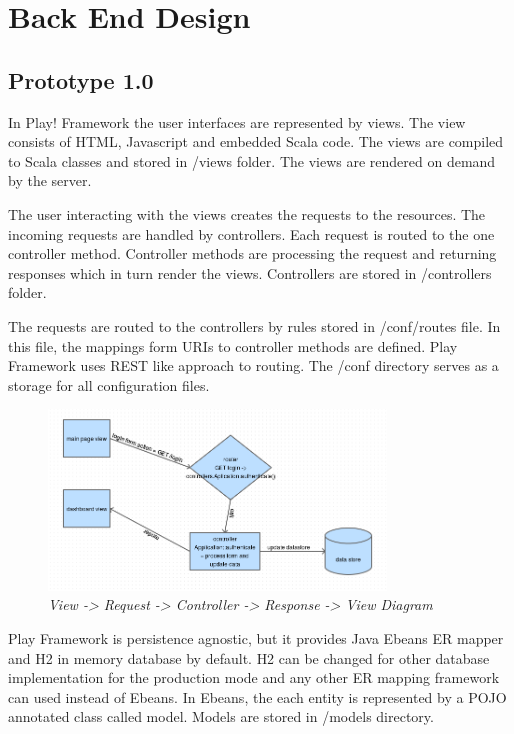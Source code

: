 \documentclass[12pt,twoside,a4paper]{report}
\begin{document}
\section{Back End Design}\label{3.9}

\subsection{Prototype 1.0}\label{3.9.1}
In Play! Framework the user interfaces are represented by views. The view consists of HTML, Javascript and embedded Scala\cite{30} code. The views are compiled to Scala classes and stored in /views folder. The views are rendered on demand by the server.

The user interacting with the views creates the requests to the resources. The incoming requests are handled by controllers. Each request is routed to the one controller method. Controller methods are processing the request and returning responses which in turn render the views. Controllers are stored in /controllers folder.

The requests are routed to the controllers by rules stored in /conf/routes file. In this file, the mappings form URIs to controller methods are defined. Play Framework uses REST like approach to routing. The /conf directory serves as a storage for all configuration files.

\begin{figure}[!ht]
	\centering
		\includegraphics[width=0.8\textwidth, totalheight=7cm]
		{play_flowchart}
	\caption{\textit{View -> Request -> Controller -> Response -> View Diagram}}
	\label{f3.9.2}
\end{figure}

Play Framework is persistence agnostic, but it provides Java Ebeans ER mapper and H2 in memory database by default. H2 can be changed for other database implementation for the production mode and any other ER mapping framework can used instead of Ebeans. In Ebeans, the each entity is represented by a POJO annotated class called model. Models are stored in /models directory.
\end{document}

